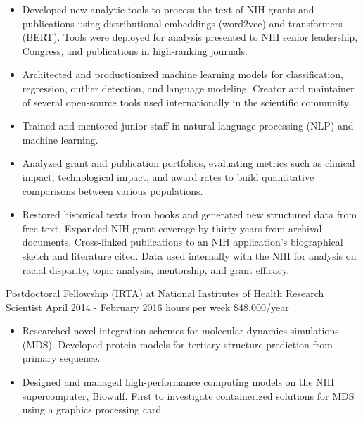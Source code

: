 \documentclass[]{scrartcl}
\begin{document}
\begin{cleanCV}
{\begin{itemize}
    \item Developed new analytic tools to process the text of NIH grants and publications using distributional embeddings (word2vec) and transformers (BERT). Tools were deployed for analysis presented to NIH senior leadership, Congress, and publications in high-ranking journals.

    \item Architected and productionized machine learning models for classification, regression, outlier detection, and language modeling. Creator and maintainer of several open-source tools used internationally in the scientific community.

      \item Trained and mentored junior staff in natural language processing (NLP) and machine learning.
  
  \item Analyzed grant and publication portfolios, evaluating metrics such as clinical impact, technological impact, and award rates to build quantitative comparisons between various populations.
    
  \item Restored historical texts from books and generated new structured data from free text. Expanded NIH grant coverage by thirty years from archival documents. Cross-linked publications to an NIH application's biographical sketch and literature cited. Data used internally with the NIH for analysis on racial disparity, topic analysis, mentorship, and grant efficacy.    
    
  \end{itemize}
}

\vspace{0.5em}
 
\WorkExperience
{}
{Postdoctoral Fellowship (IRTA) at National Institutes of Health}
{\newline Research Scientist}
{
  \newline April 2014 - February 2016
   hours per week
  \newline \$48,000/year
}
{
  \begin{itemize}
  \item Researched novel integration schemes for molecular dynamics simulations (MDS). Developed protein models for tertiary structure prediction from primary sequence.

  \item Designed and managed high-performance computing models on the NIH supercomputer, Biowulf. First to investigate containerized solutions for MDS using a graphics processing card.


\end{itemize}}
\end{cleanCV}
\end{document}
